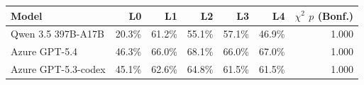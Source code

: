 \begin{tabular}{lrrrrrr}
\toprule
Model & L0 & L1 & L2 & L3 & L4 & $\chi^2$ $p$ (Bonf.) \\
\midrule
Qwen 3.5 397B-A17B & 20.3\% & 61.2\% & 55.1\% & 57.1\% & 46.9\% & 1.000 \\
Azure GPT-5.4 & 46.3\% & 66.0\% & 68.1\% & 66.0\% & 67.0\% & 1.000 \\
Azure GPT-5.3-codex & 45.1\% & 62.6\% & 64.8\% & 61.5\% & 61.5\% & 1.000 \\
\bottomrule
\end{tabular}
